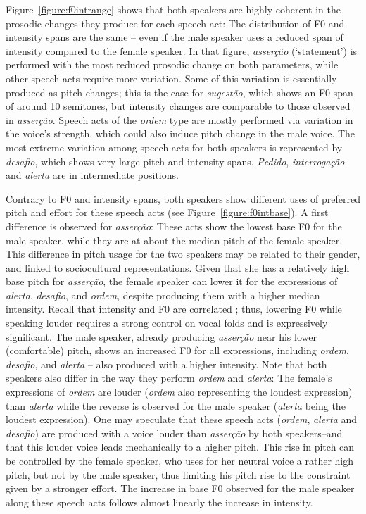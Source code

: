 \documentclass[output=paper]{LSP/langsci}
\begin{document}
Figure~\ref{figure:f0intrange} shows that both speakers are highly coherent in the prosodic changes they produce for each speech act: The distribution of F0 and intensity spans are the same -- even if the male speaker uses a reduced span of intensity compared to the female speaker. 
In that figure, \textit{asserção} (`statement') is performed with the most reduced prosodic change on both parameters, while other speech acts require more variation. 
Some of this variation is essentially produced as pitch changes; this is the case for \textit{sugestão}, which shows an F0 span of around 10 semitones, but intensity changes are comparable to those observed in \textit{asserção}. 
Speech acts of the \textit{ordem} type are mostly performed via variation in the voice's strength, which could also induce pitch change in the male voice. 
The most extreme variation among speech acts for both speakers is represented by
\textit{desafio}, which shows very large pitch and intensity spans. 
\textit{Pedido}, \textit{interrogação} and \textit{alerta} are in intermediate positions.


Contrary to F0 and intensity spans, both speakers show different uses of preferred pitch and effort for these speech acts (see Figure~\ref{figure:f0intbase}). 
A first difference is observed for \textit{asserção}: These acts show the lowest base F0 for the male speaker, while they are at about the median pitch of the female speaker. 
This difference in pitch usage for the two speakers may be related to their gender, and linked to sociocultural representations. 
Given that she has a relatively high base pitch for \textit{asserção}, the female speaker can lower it for the expressions of \textit{alerta}, \textit{desafio}, and \textit{ordem}, despite producing them with a higher median intensity. 
Recall that intensity and F0 are correlated \citep{Titze1992,Lienard1999,Traunmuller2000}; thus, lowering F0 while speaking louder requires a strong control on vocal folds and is expressively significant. 
The male speaker, already producing \textit{asserção} near his lower (comfortable) pitch, shows an increased F0 for all expressions, including \textit{ordem}, \textit{desafio}, and \textit{alerta} -- also produced with a higher intensity. 
Note that both speakers also differ in the way they perform \textit{ordem} and \textit{alerta}: The female's expressions of \textit{ordem} are louder (\textit{ordem} also representing the loudest expression) than \textit{alerta} while the reverse is observed for the male speaker (\textit{alerta} being the loudest expression).
One may speculate that these speech acts (\textit{ordem}, \textit{alerta} and \textit{desafio}) are produced with a voice louder than \textit{asserção} by both speakers--and that this louder voice leads mechanically to a higher pitch. 
This rise in pitch can be controlled by the female speaker, who uses for her neutral voice a rather high pitch, but not by the male speaker, thus limiting his pitch rise to the constraint given by a stronger effort. 
The increase in base F0 observed for the male speaker along these speech acts follows almost linearly the increase in intensity.
\end{document}
